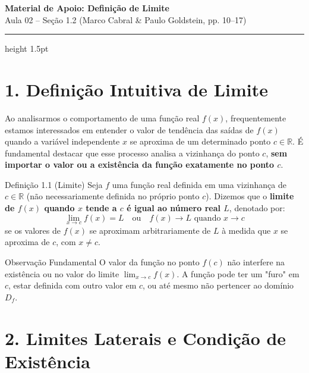 \documentclass[12pt,a4paper]{article}
\begin{document}
\begin{center}
  \vspace*{-0.3cm}
  {\LARGE\bfseries\color{primary} Material de Apoio: Definição de Limite} \\[0.2cm]
  {\small\sffamily\color{gray} Aula 02 -- Seção 1.2 (Marco Cabral \& Paulo Goldstein, pp. 10--17)}
  \vspace*{0.3cm}
  \hrule height 1.5pt \color{primary}
\end{center}

\vspace{0.3cm}

\section*{1. Definição Intuitiva de Limite}

Ao analisarmos o comportamento de uma função real $f(x)$, frequentemente estamos interessados em entender o valor de tendência das saídas de $f(x)$ quando a variável independente $x$ se aproxima de um determinado ponto $c \in \mathbb{R}$. É fundamental destacar que esse processo analisa a vizinhança do ponto $c$, \textbf{sem importar o valor ou a existência da função exatamente no ponto $c$}.

\begin{definicao}{Definição 1.1 (Limite)}
    Seja $f$ uma função real definida em uma vizinhança de $c \in \mathbb{R}$ (não necessariamente definida no próprio ponto $c$). Dizemos que o \textbf{limite de $f(x)$ quando $x$ tende a $c$ é igual ao número real $L$}, denotado por:
    $$\lim_{x \to c} f(x) = L \quad \text{ou} \quad f(x) \to L \text{ quando } x \to c$$
    se os valores de $f(x)$ se aproximam arbitrariamente de $L$ à medida que $x$ se aproxima de $c$, com $x \neq c$.
\end{definicao}

\vspace{0.2cm}
\begin{atencao}{Observação Fundamental}
    O valor da função no ponto $f(c)$ não interfere na existência ou no valor do limite $\lim_{x \to c} f(x)$. A função pode ter um "furo" em $c$, estar definida com outro valor em $c$, ou até mesmo não pertencer ao domínio $D_f$.
\end{atencao}

\vspace{0.4cm}

\section*{2. Limites Laterais e Condição de Existência}
\end{document}
